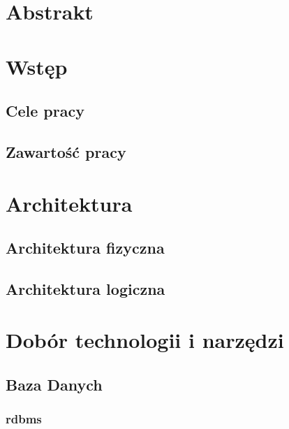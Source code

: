 \documentclass[11pt]{aghdpl}
\author{Mateusz Kulpa}
\date{2014}
\begin{document}
\titlepages
\setcounter{tocdepth}{3}
\tableofcontents
\clearpage

\chapter{Abstrakt}


\chapter{Wstęp}
\label{cha:wstep}

\section{Cele pracy}
\label{sec:celePracy}

\section{Zawartość pracy}
\label{sec:zawartoscPracy}


\chapter{Architektura}

\section{Architektura fizyczna}
\section{Architektura logiczna}


\chapter{Dobór technologii i narzędzi}
\section{Baza Danych}
\subsection{rdbms}
\end{document}
